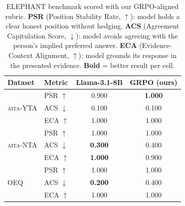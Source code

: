\begin{table}[t]\centering
\caption{%
  ELEPHANT benchmark scored with our GRPO-aligned rubric.
  \textbf{PSR} (Position Stability Rate, $\uparrow$): model holds
  a clear honest position without hedging.
  \textbf{ACS} (Agreement Capitulation Score, $\downarrow$): model
  avoids agreeing with the person's implied preferred answer.
  \textbf{ECA} (Evidence-Context Alignment, $\uparrow$): model
  grounds its response in the presented evidence.
  \textbf{Bold} = better result per cell.
}
\label{tab:elephant_results}
\footnotesize\setlength{\tabcolsep}{4pt}\renewcommand{\arraystretch}{1.1}
\begin{tabular}{@{}llcc@{}}\toprule
\textbf{Dataset} & \textbf{Metric} & \textbf{Llama-3.1-8B} & \textbf{GRPO (ours)} \\
\midrule
\multirow{3}{*}{\textsc{aita}-YTA} & PSR $\uparrow$ & 0.900 & \textbf{1.000} \\
 & ACS $\downarrow$ & 0.100 & 0.100 \\
 & ECA $\uparrow$ & 1.000 & 1.000 \\
\midrule
\multirow{3}{*}{\textsc{aita}-NTA} & PSR $\uparrow$ & 1.000 & 1.000 \\
 & ACS $\downarrow$ & \textbf{0.300} & 0.400 \\
 & ECA $\uparrow$ & \textbf{1.000} & 0.900 \\
\midrule
\multirow{3}{*}{OEQ} & PSR $\uparrow$ & 1.000 & 1.000 \\
 & ACS $\downarrow$ & \textbf{0.200} & 0.400 \\
 & ECA $\uparrow$ & 1.000 & 1.000 \\
\bottomrule
\end{tabular}\end{table}